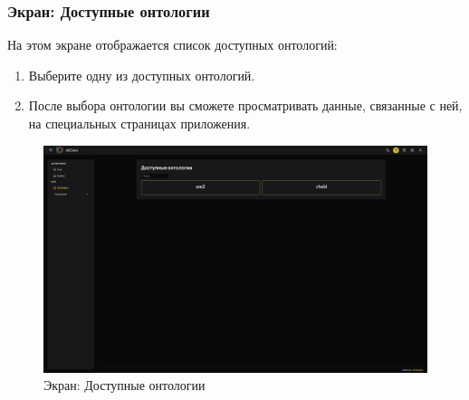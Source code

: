 \documentclass[a4paper,12pt,reqno]{article}
\begin{document}
\subsubsection{Экран: Доступные онтологии}
На этом экране отображается список доступных онтологий:
\begin{enumerate}
    \item Выберите одну из доступных онтологий.
    \item После выбора онтологии вы сможете просматривать данные, связанные с ней, на специальных страницах приложения.
\end{enumerate}
\begin{figure}[H]
    \centering
    \includegraphics[width=\textwidth]{RO/img/common_doc.png} %
    \caption{Экран: Доступные онтологии}
    \label{fig:common}
\end{figure}
\end{document}
